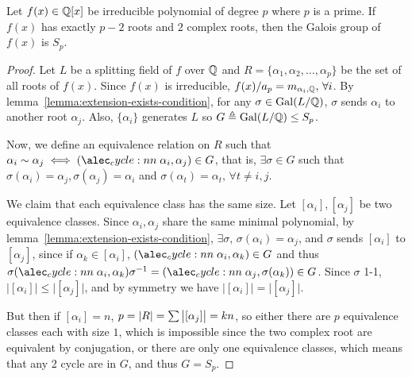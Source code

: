 \begin{prop}
  Let $f(x) \in \mathbb{Q}[x]$ be irreducible polynomial of degree $p$ where $p$ is a prime.
  If $f(x)$ has exactly $p-2$ roots and $2$ complex roots, then the Galois group of $f(x)$ is $S_p$.

  \begin{proof}
    Let $L$ be a splitting field of $f$ over $\mathbb{Q}$ and $R = \{ \alpha_1, \alpha_2, \dots, \alpha_p \}$ be
    the set of all roots of $f(x)$. Since $f(x)$ is irreducible, $f(x) / a_p = m_{\alpha_i, \mathbb{Q}}, \, \forall i$.
    By lemma~\ref{lemma:extension-exists-condition}, for any $\sigma \in \operatorname{Gal}(L/\mathbb{Q})$, $\sigma$ sends
    $\alpha_i$ to another root $\alpha_j$. Also, $\{\alpha_i\}$ generates $L$ so
    $G \triangleq \operatorname{Gal}(L/\mathbb{Q}) \leq S_p$.

    Now, we define an equivalence relation on $R$ such that $\alpha_i \sim \alpha_j \iff
    \cycle{\alpha_i, \alpha_j} \in G$, that is, $\exists \sigma \in G$ such that $\sigma(\alpha_i) = \alpha_j,
    \sigma(\alpha_j) = \alpha_i$ and $\sigma(\alpha_t) = \alpha_t, \, \forall t \neq i, j$.
 
    We claim that each equivalence class has the same size. Let $[\alpha_i], [\alpha_j]$ be
    two equivalence classes. Since $\alpha_i, \alpha_j$ share the same minimal polynomial,
    by lemma~\ref{lemma:extension-exists-condition}, $\exists \sigma,\, \sigma(\alpha_i) = \alpha_j$,
    and $\sigma$ sends $[\alpha_i]$ to $[\alpha_j]$, since if $\alpha_k \in [\alpha_i]$,
    $\cycle{\alpha_i, \alpha_k} \in G$ and thus $\sigma \cycle{\alpha_i, \alpha_k} \sigma^{-1}
    = \cycle{\alpha_j, \sigma(\alpha_k)} \in G$. Since $\sigma$ 1-1, $\big| [\alpha_i] \big| \leq \big| [\alpha_j] \big|$,
    and by symmetry we have $\big| [\alpha_i] \big| = \big| [\alpha_j] \big|$.

    But then if $[\alpha_i] = n$, $p = \lvert R\rvert = \sum \big| [\alpha_j] \big| = kn$,
    so either there are $p$ equivalence classes each with size $1$, which is impossible since
    the two complex root are equivalent by conjugation, or there are only one equivalence classes,
    which means that any 2 cycle are in $G$, and thus $G = S_p$.
  \end{proof}
\end{prop}

